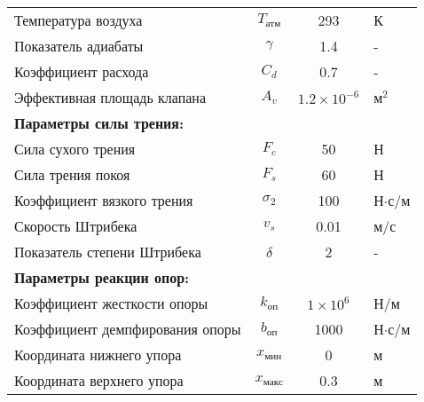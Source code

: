 \begin{table}[h]
\begin{tabular}{lccl}
        Температура воздуха              & $T_\text{атм}$                            & 293                   & К                    \\
        Показатель адиабаты              & $\gamma$                                  & 1.4                   & -                    \\
        Коэффициент расхода              & $C_d$                                     & 0.7                   & -                    \\
        Эффективная площадь клапана      & $A_v$                                     & $1.2 \times 10^{-6}$  & м$^2$                \\
        \midrule
        \multicolumn{4}{l}{\textbf{Параметры силы трения:}}                                                                         \\
        \midrule
        Сила сухого трения               & $F_c$                                     & 50                    & Н                    \\
        Сила трения покоя                & $F_s$                                     & 60                    & Н                    \\
        Коэффициент вязкого трения       & $\sigma_2$                                & 100                   & Н$\cdot$с/м          \\
        Скорость Штрибека                & $v_s$                                     & 0.01                  & м/с                  \\
        Показатель степени Штрибека      & $\delta$                                  & 2                     & -                    \\
        \midrule
        \multicolumn{4}{l}{\textbf{Параметры реакции опор:}}                                                                        \\
        \midrule
        Коэффициент жесткости опоры      & $k_\text{оп}$                             & $1 \times 10^6$       & Н/м                  \\
        Коэффициент демпфирования опоры  & $b_\text{оп}$                             & 1000                  & Н$\cdot$с/м          \\
        Координата нижнего упора         & $x_\text{мин}$                            & 0                     & м                    \\
        Координата верхнего упора        & $x_\text{макс}$                           & 0.3                   & м                    \\
        \midrule
    \end{tabular}
    \label{tab:ch2/extended_parameters}
\end{table}

